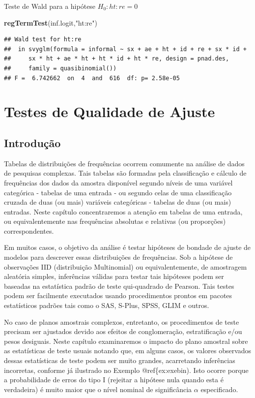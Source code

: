 \documentclass[]{book}
\newenvironment{Shaded}{\begin{snugshade}}{\end{snugshade}}
\newcommand{\KeywordTok}[1]{\textcolor[rgb]{0.13,0.29,0.53}{\textbf{#1}}}
\newcommand{\StringTok}[1]{\textcolor[rgb]{0.31,0.60,0.02}{#1}}
\newcommand{\NormalTok}[1]{#1}
\theoremstyle{definition}
\theoremstyle{definition}
\theoremstyle{definition}
\theoremstyle{remark}
\begin{document}
Teste de Wald para a hipótese \(H_0: ht:re=0\)

\begin{Shaded}
\begin{Highlighting}[]
\KeywordTok{regTermTest}\NormalTok{(inf.logit,}\StringTok{"ht:re"}\NormalTok{)}
\end{Highlighting}
\end{Shaded}

\begin{verbatim}
## Wald test for ht:re
##  in svyglm(formula = informal ~ sx + ae + ht + id + re + sx * id + 
##     sx * ht + ae * ht + ht * id + ht * re, design = pnad.des, 
##     family = quasibinomial())
## F =  6.742662  on  4  and  616  df: p= 2.58e-05
\end{verbatim}

\chapter{Testes de Qualidade de Ajuste}\label{testqualajust}

\section{Introdução}\label{introducao-1}

Tabelas de distribuições de frequências ocorrem comumente na análise de
dados de pesquisas complexas. Tais tabelas são formadas pela
classificação e cálculo de frequências dos dados da amostra disponível
segundo níveis de uma variável categórica - tabelas de uma entrada - ou
segundo celas de uma classificação cruzada de duas (ou mais) variáveis
categóricas - tabelas de duas (ou mais) entradas. Neste capítulo
concentraremos a atenção em tabelas de uma entrada, ou equivalentemente
nas frequências absolutas e relativas (ou proporções) correspondentes.

Em muitos casos, o objetivo da análise é testar hipóteses de bondade de
ajuste de modelos para descrever essas distribuições de frequências. Sob
a hipótese de observações IID (distribuição Multinomial) ou
equivalentemente, de amostragem aleatória simples, inferências válidas
para testar tais hipóteses podem ser baseadas na estatística padrão de
teste qui-quadrado de Pearson. Tais testes podem ser facilmente
executados usando procedimentos prontos em pacotes estatísticos padrões
tais como o SAS, S-Plus, SPSS, GLIM e outros.

No caso de planos amostrais complexos, entretanto, os procedimentos de
teste precisam ser ajustados devido aos efeitos de conglomeração,
estratificação e/ou pesos desiguais. Neste capítulo examinaremos o
impacto do plano amostral sobre as estatísticas de teste usuais notando
que, em alguns casos, os valores observados dessas estatísticas de teste
podem ser muito grandes, acarretando inferências incorretas, conforme já
ilustrado no Exemplo @ref\{ex:exebin). Isto ocorre porque a
probabilidade de erros do tipo I (rejeitar a hipótese nula quando esta é
verdadeira) é muito maior que o nível nominal de significância
\(\alpha\) especificado.
\end{document}
